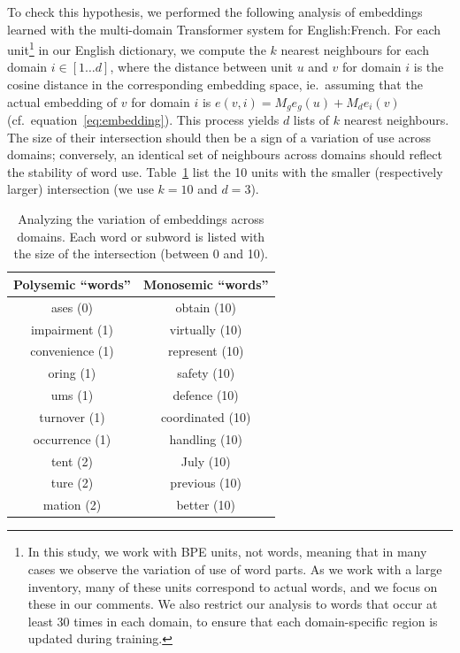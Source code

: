 \documentclass[a4paper]{article}
\begin{document}
To check this hypothesis, we performed the following analysis of embeddings learned with the multi-domain Transformer system for English:French. For each unit\footnote{In this study, we work with BPE units, not words, meaning that in many cases we observe the variation of use of word parts. As we work with a large inventory, many of these units correspond to actual words, and we focus on these in our comments. We also restrict our analysis to words that occur at least 30 times in each domain, to ensure that each domain-specific region is updated during training.} in our English dictionary, we compute the $k$ nearest neighbours for each domain $i \in [1\dots{}d]$, where the distance between unit $u$ and $v$ for domain $i$ is the cosine distance in the corresponding embedding space, ie.\ assuming that the actual embedding of $v$ for domain $i$ is $e(v,i) = M_ge_g(u) + M_de_i(v)$ (cf.\ equation~\eqref{eq:embedding}). This process yields $d$ lists of $k$ nearest neighbours. The size of their intersection should then be a sign of a variation of use across domains; conversely, an identical set of neighbours across domains should reflect the stability of word use. Table~\ref{tab:embeddings} list the 10 units with the smaller (respectively larger) intersection (we use $k=10$ and $d=3$). 

\begin{table}
  \centering
  \begin{tabular}{c|c}
    Polysemic ``words'' & Monosemic ``words'' \\ \hline
     ases (0) &               obtain (10) \\       
     impairment (1) &     virtually (10) \\    
     convenience (1) &    represent (10) \\    
     oring (1) &              safety (10) \\       
     ums (1) &               defence (10) \\      
     turnover (1) &         coordinated (10) \\  
     occurrence (1) &     handling (10) \\     
     tent (2) &               July (10) \\         
     ture (2) &               previous (10) \\     
     mation (2) &           better (10) \\ \hline
  \end{tabular}
  \caption{Analyzing the variation of embeddings across domains. Each word or subword is listed with the size of the intersection (between 0 and 10).}
  \label{tab:embeddings}
\end{table}
\end{document}

